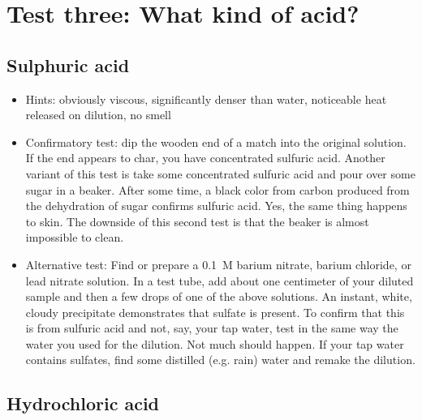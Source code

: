 \section{Test three: What kind of acid?}

\subsection{Sulphuric acid} 

\begin{itemize}

\item{Hints: obviously viscous, 
significantly denser than water, 
noticeable heat released on dilution, 
no smell}

\item{Confirmatory test: dip the wooden end of a match into the original solution. 
If the end appears to char, 
you have concentrated sulfuric acid. 
Another variant of this test is take some concentrated sulfuric acid 
and pour over some sugar in a beaker. 
After some time, 
a black color from carbon produced 
from the dehydration of sugar confirms sulfuric acid. 
Yes, 
the same thing happens to skin. 
The downside of this second test is that the beaker 
is almost impossible to clean.}

\item{Alternative test: Find or prepare a 0.1~M barium nitrate, 
barium chloride, 
or lead nitrate solution. 
In a test tube, 
add about one centimeter of your diluted sample 
and then a few drops of one of the above solutions. 
An instant, 
white, 
cloudy precipitate demonstrates that sulfate is present. 
To confirm that this is from sulfuric acid and not, 
say, 
your tap water, 
test in the same way the water you used for the dilution. 
Not much should happen. 
If your tap water contains sulfates, 
find some distilled (e.g. 
rain) water and remake the dilution.}
\end{itemize}

\subsection{Hydrochloric acid} 


